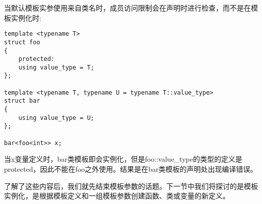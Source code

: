 当默认模板实参使用来自类名时，成员访问限制会在声明时进行检查，而不是在模板实例化时:

\begin{lstlisting}[style=styleCXX]
template <typename T>
struct foo
{
	protected:
	using value_type = T;
};

template <typename T, typename U = typename T::value_type>
struct bar
{
	using value_type = U;
};

bar<foo<int>> x;
\end{lstlisting}

当x变量定义时，bar类模板即会实例化，但是foo::value\_type的类型的定义是protected，因此不能在foo之外使用。结果是在bar类模板的声明处出现编译错误。

了解了这些内容后，我们就先结束模板参数的话题。下一节中我们将探讨的是模板实例化，是根据模板定义和一组模板参数创建函数、类或变量的新定义。








